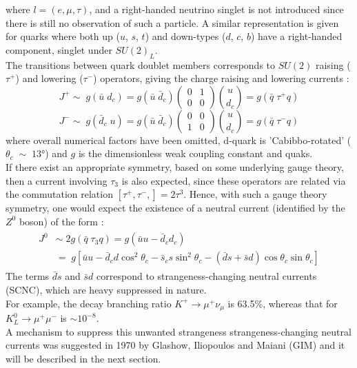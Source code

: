 where $ l= (e,\mu,\tau)$, and a right-handed neutrino singlet is not introduced since there is still no observation of such a particle. A similar representation is given for
quarks where both up ($u$, $s$, $t$) and down-types ($d$, $c$, $b$) have a right-handed component, singlet under $SU(2)_L$.
\vspace{\baselineskip}
\\The transitions between quark doublet members corresponds to $SU(2)$ raising ($\tau^+$) and lowering ($\tau^-$) operators, giving the charge raising and lowering currents \cite{renton}:
\begin{equation*}
J^{+} \sim \; g(\bar{u} \; d_{c}) = g(\bar{u} \; \bar{d}_{c})\left(\begin{array}{cc}  
																								0 & 1 \\ 
																								0 & 0
																								\end{array} \right)  \binom{u}{d_c} = g (\bar{q} \; \tau^{+}q)  
\end{equation*}
\begin{equation}
J^{-} \sim \; g(\bar{d}_c \; u) = g(\bar{u} \; \bar{d}_{c})\left(\begin{array}{cc}  
																								0 & 0 \\ 
																								1 & 0
																								\end{array} \right)  \binom{u}{d_c} = g (\bar{q} \; \tau^{-}q)  
\end{equation}
where overall numerical factors have been omitted, d-quark is 'Cabibbo-rotated' ($\theta_c\;\sim\; 13\si{\degree}$) and  $g$ is the dimensionless weak coupling constant and quaks.
\vspace{\baselineskip}
\\If there exist an appropriate symmetry, based on some underlying gauge theory, then a current involving $\tau_3$ is also expected, since these operators are related via 
the commutation relation $\left[  \tau^{+}, \tau^{-}, \right] = 2\tau^3$. Hence, with such a gauge theory symmetry, one would expect the existence of a neutral current
(identified by the $Z^0$ boson) of the form :
\begin {align}
	\begin{split}
		J^{0} & \sim \; 2g (\bar{q} \; \tau_{3}q)  = g(\bar{u} u- \bar{d}_{c} d_{c}) \\
				& = \; g[ \bar{u} u- \bar{d}_{c} d \cos^{2}\theta_{c}  - \bar{s}_{c} s \sin^{2}\theta_{c} - (\bar{d} s + \bar{s} d) \cos\theta_{c}\sin\theta_{c}  ]
	\end{split}						
\end{align}
The terms $\bar{d} s$ and $\bar{s} d$ correspond to strangeness-changing neutral currents (SCNC), which are heavy suppressed in nature. \\
For example, the decay branching ratio $K^{+}\rightarrow \mu^{+} \nu_{\mu}$ is 63.5\%, whereas that for $K^{0}_{L}\rightarrow \mu^{+} \mu^{-}$ is $\sim 10^{-8}$.\\
A mechanism to suppress this unwanted strangeness strangeness-changing neutral currents was suggested in 1970 by Glashow, Iliopoulos and Maiani (GIM) and it will be described in the next section.

